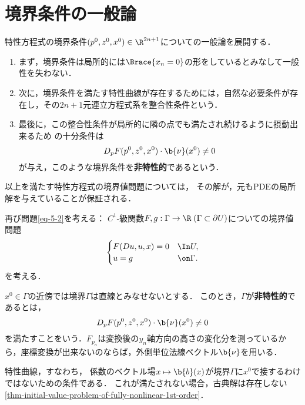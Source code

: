 \documentclass[uplatex,dvipdfmx]{jsreport}
\begin{document}
\section{境界条件の一般論}

\begin{tcolorbox}[colframe=ForestGreen, colback=ForestGreen!10!white,breakable,colbacktitle=ForestGreen!40!white,coltitle=black,fonttitle=\bfseries\sffamily,
title=境界条件が特性曲線を与えないための条件を非特性性という]
    特性方程式の境界条件$(p^0,z^0,x^0)\in\R^{2n+1}$についての一般論を展開する．
    \begin{enumerate}
        \item まず，境界条件は局所的には$\Brace{x_n=0}$の形をしているとみなして一般性を失わない．
        \item 次に，境界条件を満たす特性曲線が存在するためには，自然な必要条件が存在し，その$2n+1$元連立方程式系を整合性条件という．
        \item 最後に，この整合性条件が局所的に隣の点でも満たされ続けるように摂動出来るため
        の十分条件は
        \[D_pF(p^0,z^0,x^0)\cdot\b{\nu}(x^0)\ne0\]
        が与え，このような境界条件を\textbf{非特性的}であるという．
    \end{enumerate}
    以上を満たす特性方程式の境界値問題については，
    その解が，元もPDEの局所解を与えていることが保証される．
\end{tcolorbox}

\begin{problem}
    再び問題\ref{eq-5-2}を考える：
    $C^1$-級関数$F,g:\Gamma\to\R\;(\Gamma\subset\partial U)$についての境界値問題
    \[
        \begin{cases}
            F(Du,u,x)=0&\In U,\\
            u=g&\on\Gamma.
        \end{cases}
    \]
    を考える．
\end{problem}
\begin{definition}[一般の境界に対する非特性性条件]\label{remark-noncharacteristic-condition}
    $x^0\in\Gamma$の近傍では境界$\Gamma$は直線とみなせないとする．
    このとき，$\Gamma$が\textbf{非特性的}であるとは，
    \[D_pF(p^0,z^0,x^0)\cdot\b{\nu}(x^0)\ne0\]
    を満たすことをいう．$F_{p_n}$は変換後の$y_n$軸方向の高さの変化分を測っているから，座標変換が出来ないのならば，外側単位法線ベクトル$\b{\nu}$を用いる．
\end{definition}
\begin{remarks}
    特性曲線，すなわち，
    係数のベクトル場$x\mapsto\b{b}(x)$が境界$\Gamma$に$x^0$で接するわけではないための条件である．
    これが満たされない場合，古典解は存在しない\ref{thm-initial-value-problem-of-fully-nonlinear-1st-order}．
\end{remarks}
\end{document}

